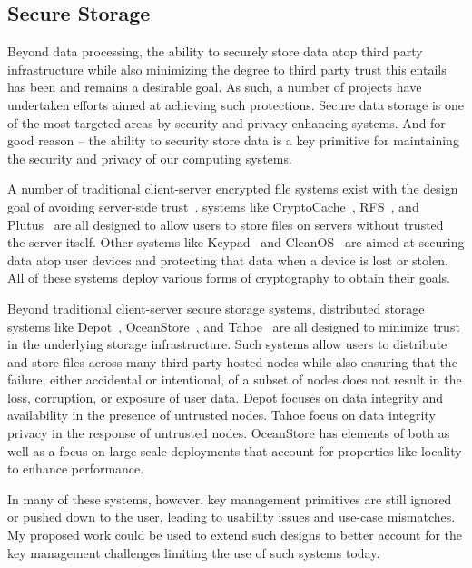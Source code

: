\subsection{Secure Storage}

Beyond data processing, the ability to securely store data atop third
party infrastructure while also minimizing the degree to third party
trust this entails has been and remains a desirable goal. As such, a
number of projects have undertaken efforts aimed at achieving such
protections.  Secure data storage is one of the most targeted areas by
security and privacy enhancing systems. And for good reason -- the
ability to security store data is a key primitive for maintaining the
security and privacy of our computing systems.

A number of traditional client-server encrypted file systems exist
with the design goal of avoiding server-side
trust~\cite{kher2005}. systems like CryptoCache~\cite{jensen2000},
RFS~\cite{dong2011}, and Plutus~\cite{kallahalla2003} are all designed
to allow users to store files on servers without trusted the server
itself. Other systems like Keypad~\cite{geambasu2011} and
CleanOS~\cite{tang2012} are aimed at securing data atop user devices
and protecting that data when a device is lost or stolen. All of these
systems deploy various forms of cryptography to obtain their goals.
 
Beyond traditional client-server secure storage systems, distributed
storage systems like Depot~\cite{mahajan2011},
OceanStore~\cite{kubiatowicz2000}, and Tahoe~\cite{wilcox-o'hearn2008}
are all designed to minimize trust in the underlying storage
infrastructure. Such systems allow users to distribute and store files
across many third-party hosted nodes while also ensuring that the
failure, either accidental or intentional, of a subset of nodes does
not result in the loss, corruption, or exposure of user data. Depot
focuses on data integrity and availability in the presence of
untrusted nodes. Tahoe focus on data integrity privacy in the response
of untrusted nodes. OceanStore has elements of both as well as a focus
on large scale deployments that account for properties like locality
to enhance performance.

In many of these systems, however, key management primitives are still
ignored or pushed down to the user, leading to usability issues and
use-case mismatches. My proposed work could be used to extend such
designs to better account for the key management challenges limiting
the use of such systems today.


